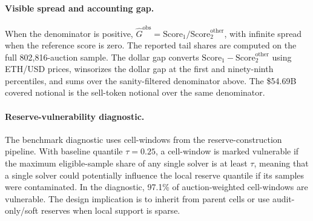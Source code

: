 \paragraph{Visible spread and accounting gap.}
When the denominator is positive,
$\widehat G^{\mathrm{obs}}=\mathrm{Score}_1/
\mathrm{Score}^{\mathrm{other}}_2$, with infinite spread when the
reference score is zero. The reported tail shares are computed on the full
802,816-auction sample. The dollar gap converts
$\mathrm{Score}_1-\mathrm{Score}^{\mathrm{other}}_2$ using ETH/USD prices,
winsorizes the dollar gap at the first and ninety-ninth percentiles, and
sums over the sanity-filtered denominator above. The \$54.69B covered
notional is the sell-token notional over the same denominator.

\paragraph{Reserve-vulnerability diagnostic.}
The benchmark diagnostic uses cell-windows from the reserve-construction
pipeline. With baseline quantile $\tau=0.25$, a cell-window is marked
vulnerable if the maximum eligible-sample share of any single solver is at
least $\tau$, meaning that a single solver could potentially influence the
local reserve quantile if its samples were contaminated. In the diagnostic,
97.1\% of auction-weighted cell-windows are vulnerable. The design
implication is to inherit from parent cells or use audit-only/soft reserves
when local support is sparse.
